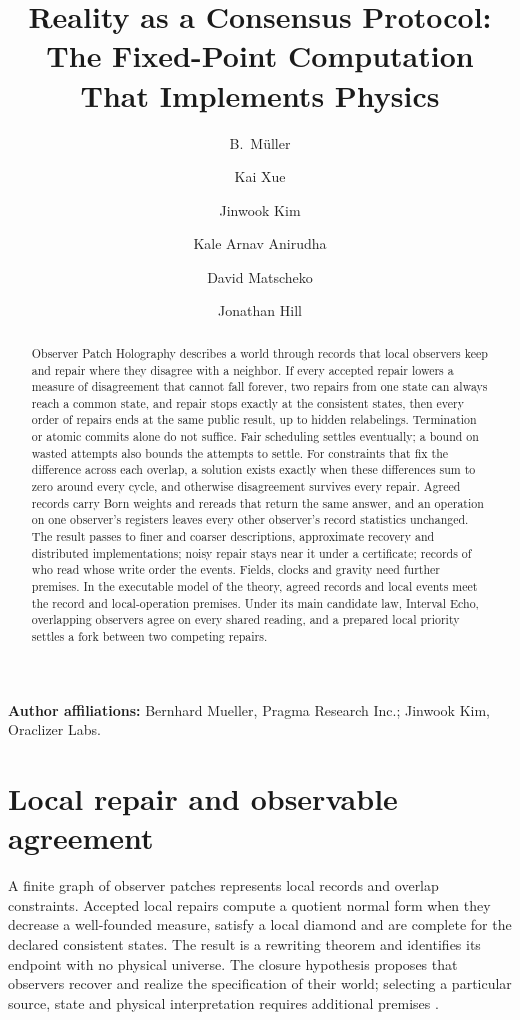 \documentclass[11pt]{article}
\title{Reality as a Consensus Protocol:\\
The Fixed-Point Computation That Implements Physics}
\author{B.\ M\"uller \and Kai Xue \and Jinwook Kim \and Kale Arnav Anirudha \and David Matscheko \and Jonathan Hill}
\date{\OPHPaperReleaseDate}
\theoremstyle{remark}
\theoremstyle{plain}
\begin{document}
\maketitle
\OPHPaperReleaseBanner

\begin{center}
\small\textbf{Author affiliations:} Bernhard Mueller, Pragma Research Inc.;
Jinwook Kim, Oraclizer Labs.
\end{center}

\begin{abstract}
Observer Patch Holography describes a world through records that local
observers keep and repair where they disagree with a neighbor. If every
accepted repair lowers a measure of disagreement that cannot fall forever, two
repairs from one state can always reach a common state, and repair stops
exactly at the consistent states, then every order of repairs ends at the
same public result, up to hidden relabelings. Termination or atomic commits
alone do not suffice. Fair scheduling settles eventually; a bound on wasted
attempts also bounds the attempts to settle. For constraints that fix the
difference across each overlap, a solution exists exactly when these
differences sum to zero around every cycle, and otherwise disagreement
survives every repair. Agreed records carry Born weights and rereads that
return the same answer, and an operation on one observer's registers leaves
every other observer's record statistics unchanged. The result passes to
finer and coarser descriptions, approximate recovery and distributed
implementations; noisy repair stays near it under a certificate; records of
who read whose write order the events. Fields, clocks and gravity need
further premises. In the executable model of the theory, agreed records and
local events meet the record and local-operation premises. Under its main
candidate law, Interval Echo, overlapping observers agree on every shared
reading, and a prepared local priority settles a fork between two competing
repairs.
\end{abstract}


\section{Local repair and observable agreement}

A finite graph of observer patches represents local records and overlap
constraints. Accepted local repairs compute a quotient normal form when
they decrease a well-founded measure, satisfy a local diamond and are
complete for the declared consistent states. The result is a rewriting
theorem and identifies its endpoint with no physical universe.
The closure hypothesis proposes that observers recover and realize the
specification of their world; selecting a particular source, state and
physical interpretation requires additional premises \cite{ophsynthesis}.
\end{document}
